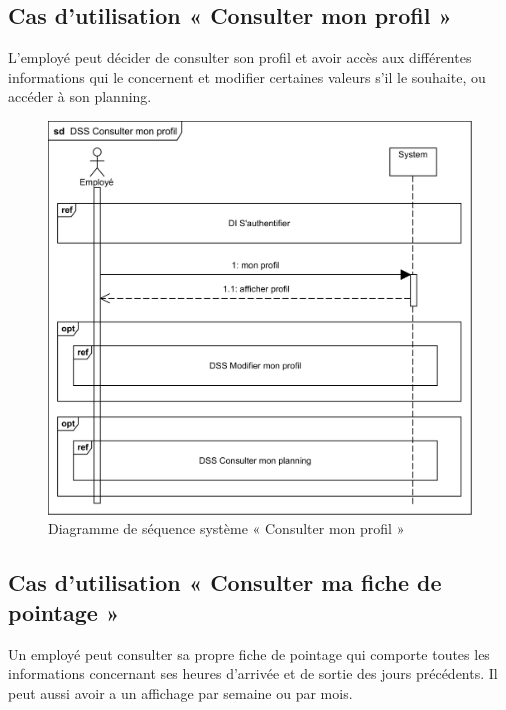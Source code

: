 \subsection{Cas d'utilisation « Consulter mon profil »}
L’employé peut décider de consulter son profil et avoir accès aux différentes
informations qui le concernent et modifier certaines valeurs s’il le souhaite, 
ou accéder à son planning. 
 
\begin{figure}[h!]
     \centering
     \includegraphics[scale=1.18]{images/DSS/DSS Consulter mon profil.png}
     \caption{Diagramme de séquence système « Consulter mon profil »}
     \label{fig4}
\end{figure}
\clearpage
\subsection{Cas d'utilisation « Consulter ma  fiche de pointage »}
Un employé peut consulter sa propre fiche de pointage qui comporte toutes les
informations concernant ses heures d’arrivée et de sortie des jours précédents.
Il peut aussi avoir a un affichage par semaine ou par mois.
   
